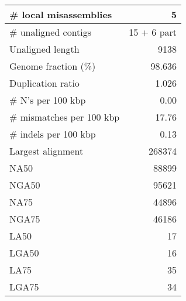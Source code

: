 \documentclass[12pt,a4paper]{article}
\begin{document}
\begin{table}[ht]
\begin{center}
\begin{tabular}{|l*{1}{|r}|}
\# local misassemblies & 5 \\ \hline
\# unaligned contigs & 15 + 6 part \\ \hline
Unaligned length & 9138 \\ \hline
Genome fraction (\%) & 98.636 \\ \hline
Duplication ratio & 1.026 \\ \hline
\# N's per 100 kbp & 0.00 \\ \hline
\# mismatches per 100 kbp & 17.76 \\ \hline
\# indels per 100 kbp & 0.13 \\ \hline
Largest alignment & 268374 \\ \hline
NA50 & 88899 \\ \hline
NGA50 & 95621 \\ \hline
NA75 & 44896 \\ \hline
NGA75 & 46186 \\ \hline
LA50 & 17 \\ \hline
LGA50 & 16 \\ \hline
LA75 & 35 \\ \hline
LGA75 & 34 \\ \hline
\end{tabular}
\end{center}
\end{table}
\end{document}
